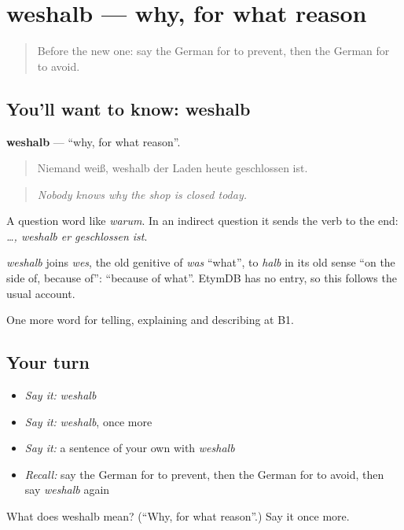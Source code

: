 \section[weshalb]{weshalb — why, for what reason}

\label{lesson:GE-C347-weshalb}



\begin{quote}
Before the new one: say the German for to prevent, then the German for to avoid.
\end{quote}

\subsection*{You'll want to know: weshalb}
\textbf{weshalb} — \textquotedblleft{}why, for what reason\textquotedblright{}.

\begin{quote}
Niemand weiß, weshalb der Laden heute geschlossen ist.
\end{quote}

\begin{quote}
\emph{Nobody knows why the shop is closed today.}
\end{quote}

A question word like \emph{warum}. In an indirect question it sends the verb to the end: \emph{…, weshalb er geschlossen ist}.

\begin{cousinweb}
\emph{weshalb} joins \emph{wes}, the old genitive of \emph{was} \textquotedblleft{}what\textquotedblright{}, to \emph{halb} in its old sense \textquotedblleft{}on the side of, because of\textquotedblright{}: \textquotedblleft{}because of what\textquotedblright{}. EtymDB has no entry, so this follows the usual account.
\end{cousinweb}

\begin{grammarlens}[title={What you've built}]
One more word for telling, explaining and describing at B1.
\end{grammarlens}

\subsection*{Your turn}
\begin{itemize}
\raggedright
  \item \emph{Say it:} \emph{weshalb}
  \item \emph{Say it:} \emph{weshalb}, once more
  \item \emph{Say it:} a sentence of your own with \emph{weshalb}
  \item \emph{Recall:} say the German for to prevent, then the German for to avoid, then say \emph{weshalb} again
\end{itemize}

\begin{tcolorbox}[breakable,colback=teal!4,colframe=teal!35!black,title={Before you move on}]
What does weshalb mean? (\textquotedblleft{}Why, for what reason\textquotedblright{}.) Say it once more.
\end{tcolorbox}
